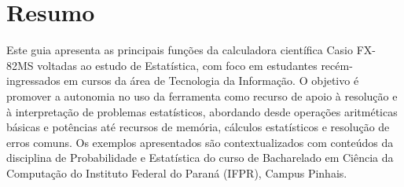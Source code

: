 \chapter*{Resumo}

Este guia apresenta as principais funções da calculadora científica Casio FX-82MS voltadas ao estudo de Estatística, com foco em estudantes recém-ingressados em cursos da área de Tecnologia da Informação. O objetivo é promover a autonomia no uso da ferramenta como recurso de apoio à resolução e à interpretação de problemas estatísticos, abordando desde operações aritméticas básicas e potências até recursos de memória, cálculos estatísticos e resolução de erros comuns. Os exemplos apresentados são contextualizados com conteúdos da disciplina de Probabilidade e Estatística do curso de Bacharelado em Ciência da Computação do Instituto Federal do Paraná (IFPR), Campus Pinhais.